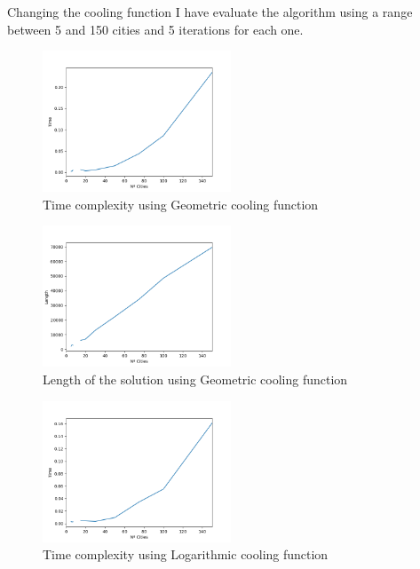 \documentclass{article}
\begin{document}
            Changing the cooling function I have evaluate the algorithm using a range between 5 and 150 cities and 5 iterations for each one.

            \begin{figure}[H]

                \centering
                \includegraphics[width=0.5\textwidth]{../media/03.SimAnnealing-Geometric-time.png}
                \caption{Time complexity using Geometric cooling function}
                \label{Time complexity using Geometric cooling function}
    
            \end{figure}

            \begin{figure}[H]

                \centering
                \includegraphics[width=0.5\textwidth]{../media/03.SimAnnealing-Geometric-length.png}
                \caption{Length of the solution using Geometric cooling function}
                \label{Length of the solution using Geometric cooling function}
    
            \end{figure}

            \begin{figure}[H]

                \centering
                \includegraphics[width=0.5\textwidth]{../media/03.SimAnnealing-Logarithmic-time.png}
                \caption{Time complexity using Logarithmic cooling function}
                \label{Time complexity using Logarithmic cooling function}
    
            \end{figure}
\end{document}
